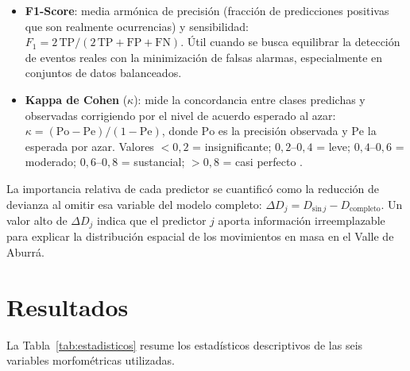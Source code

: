 \documentclass[12pt,a4paper]{article}
\begin{document}
\begin{itemize}
    \item \textbf{F1-Score}: media armónica de precisión
    (fracción de predicciones positivas que son realmente ocurrencias)
    y sensibilidad:
    $F_1 = 2\,\mathrm{TP}/(2\,\mathrm{TP}+\mathrm{FP}+\mathrm{FN})$.
    Útil cuando se busca equilibrar la detección de eventos reales
    con la minimización de falsas alarmas, especialmente en conjuntos
    de datos balanceados.

    \item \textbf{Kappa de Cohen} ($\kappa$): mide la concordancia
    entre clases predichas y observadas corrigiendo por el nivel de
    acuerdo esperado al azar:
    $\kappa = (\mathrm{Po} - \mathrm{Pe})/(1 - \mathrm{Pe})$,
    donde $\mathrm{Po}$ es la precisión observada y $\mathrm{Pe}$
    la esperada por azar. Valores $<0{,}2$ = insignificante;
    $0{,}2$--$0{,}4$ = leve; $0{,}4$--$0{,}6$ = moderado;
    $0{,}6$--$0{,}8$ = sustancial; $>0{,}8$ = casi perfecto
    \citep{cohen1960}.
\end{itemize}

La importancia relativa de cada predictor se cuantificó como la
reducción de devianza al omitir esa variable del modelo completo:
$\Delta D_j = D_{\mathrm{sin}\,j} - D_{\mathrm{completo}}$.
Un valor alto de $\Delta D_j$ indica que el predictor $j$ aporta
información irreemplazable para explicar la distribución espacial
de los movimientos en masa en el Valle de Aburrá.

\section{Resultados}

La Tabla~\ref{tab:estadisticos} resume los estadísticos descriptivos
de las seis variables morfométricas utilizadas.
\end{document}

